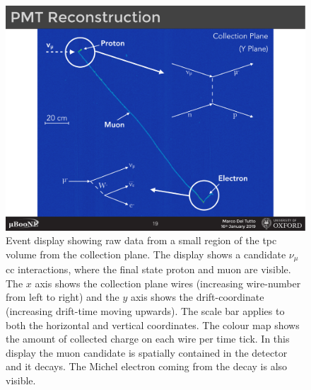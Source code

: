 \begin{figure}[]
\centering
\includegraphics[width=1.0\textwidth]{images/MicroBooNE/evd_2}
\caption[MicroBooNE Event Display with Neutrino Candidate]{Event display showing raw data from a small region of the \acrshort{tpc} volume from the collection plane. The display shows a candidate $\nu_\mu$ \acrshort{cc} interactions, where the final state proton and muon are visible. The $x$ axis shows the collection plane wires (increasing wire-number from left to right) and the $y$ axis shows the drift-coordinate (increasing drift-time moving upwards). The scale bar applies to both the horizontal and vertical coordinates. The colour map shows the amount of collected charge on each wire per time tick. In this display the muon candidate is spatially contained in the detector and it decays. The Michel electron coming from the decay is also visible.}
\label{fig:evd}
\end{figure}


